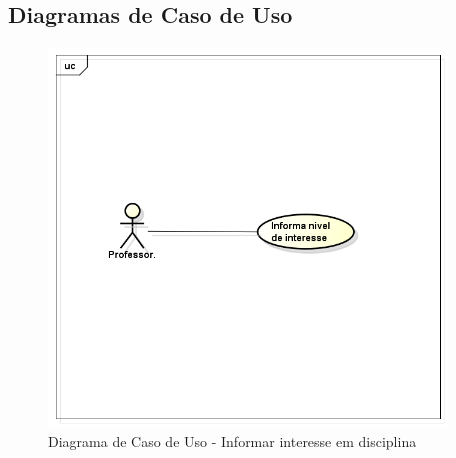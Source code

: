 \documentclass{abnt}
\begin{document}
		\subsection{Diagramas de Caso de Uso}	
		\begin{figure}[h]
			\begin{center}
				 \includegraphics[width=400px]{casoUsoInformarInteresseDisciplina}
				 \caption{Diagrama de Caso de Uso - Informar interesse em disciplina}
			\end{center}
		\end{figure}
		
		\FloatBarrier
		
\end{document}

